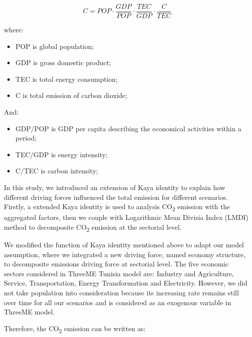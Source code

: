 \documentclass[
]{article}
\providecommand{\tightlist}{%
  \setlength{\itemsep}{0pt}\setlength{\parskip}{0pt}}
\begin{document}
\[ C = POP \cdot \frac{GDP}{POP} \cdot \frac{TEC}{GDP} \cdot \frac{C}{TEC} \tag{1}\]

where:

\begin{itemize}
\tightlist
\item
  POP is global population;
\item
  GDP is gross domestic product;
\item
  TEC is total energy consumption;
\item
  C is total emission of carbon dioxide;
\end{itemize}

And:

\begin{itemize}
\tightlist
\item
  GDP/POP is GDP per capita describing the economical activities within
  a period;
\item
  TEC/GDP is energy intensity;
\item
  C/TEC is carbon intensity;
\end{itemize}

In this study, we introduced an extension of Kaya identity to explain
how different driving forces influenced the total emission for different
scenarios. Firstly, a extended Kaya identity is used to analysis
CO\textsubscript{2} emission with the aggregated factors, then we couple
with Logarithmic Mean Divisia Index (LMDI) method to decomposite
CO\textsubscript{2} emission at the sectorial level.

We modified the function of Kaya identity mentioned above to adapt our
model assumption, where we integrated a new driving force, named economy
structure, to decomposite emissions driving force at sectorial level.
The five economic sectors considered in ThreeME Tunisia model are:
Industry and Agriculture, Service, Transportation, Energy Transformation
and Electricity. However, we did not take population into consideration
because its increasing rate remains still over time for all our
scenarios and is considered as an exogenous variable in ThreeME model.

Therefore, the CO\textsubscript{2} emission can be written as:
\end{document}
